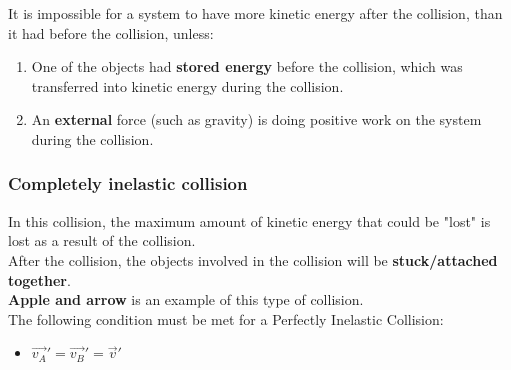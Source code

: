 It is impossible for a system to have more kinetic energy after the collision, than it had before the collision, unless:
\begin{enumerate}
    \item One of the objects had \textbf{stored energy} before the collision, which was transferred into kinetic energy during the collision. 
    \item An \textbf{external} force (such as gravity) is doing positive work on the system during the collision. 
\end{enumerate}

\subsubsection{Completely inelastic collision}
In this collision, the maximum amount of kinetic energy that could be "lost" is lost as a result of the collision. \\

After the collision, the objects involved in the collision will be \textbf{stuck/attached together}.\\

\textbf{Apple and arrow} is an example of this type of collision. \\

The following condition must be met for a Perfectly Inelastic Collision:
\begin{itemize}
    \item $\vec{v_A}' = \vec{v_B}' = \vec{v}'$
\end{itemize}
